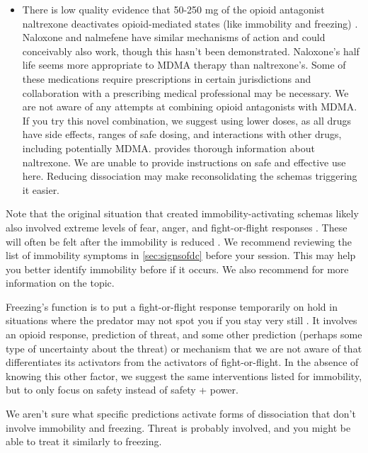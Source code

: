\documentclass[12pt,letterpaper]{book}
\begin{document}
\begin{itemize}
	\item There is low quality evidence that 50-250 mg of the opioid antagonist naltrexone deactivates opioid-mediated states (like immobility and freezing) \cite{escamilla2023treatment}. Naloxone and nalmefene have similar mechanisms of action and could conceivably also work, though this hasn't been demonstrated. Naloxone's half life seems more appropriate to MDMA therapy than naltrexone's. Some of these medications require prescriptions in certain jurisdictions and collaboration with a prescribing medical professional may be necessary. We are not aware of any attempts at combining opioid antagonists with MDMA. If you try this novel combination, we suggest using lower doses, as all drugs have side effects, ranges of safe dosing, and interactions with other drugs, including potentially MDMA. \textcite{naltrexoneInfo} provides thorough information about naltrexone. We are unable to provide instructions on safe and effective use here. Reducing dissociation may make reconsolidating the schemas triggering it easier.
\end{itemize}
Note that the original situation that created immobility-activating schemas likely also involved extreme levels of fear, anger, and fight-or-flight responses \cite{kozlowskaDefenseCascade}. These will often be felt after the immobility is reduced \cite{razviPSIP}. We recommend reviewing the list of immobility symptoms in \ref{sec:signsofdc} before your session. This may help you better identify immobility before if it occurs. We also recommend \textcite{razviDissociation} for more information on the topic.

Freezing's function is to put a fight-or-flight response temporarily on hold in situations where the predator may not spot you if you stay very still \cite{kozlowskaDefenseCascade}. It involves an opioid response, prediction of threat, and some other prediction (perhaps some type of uncertainty about the threat) or mechanism that we are not aware of that differentiates its activators from the activators of fight-or-flight. In the absence of knowing this other factor, we suggest the same interventions listed for immobility, but to only focus on safety instead of safety + power.

We aren't sure what specific predictions activate forms of dissociation that don't involve immobility and freezing. Threat is probably involved, and you might be able to treat it similarly to freezing.
\end{document}
